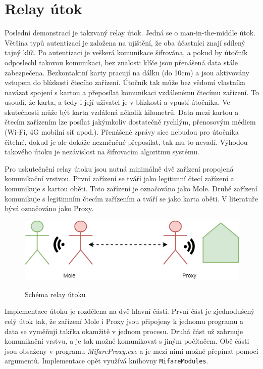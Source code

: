 \section{Relay útok}
\label{relayImplementace}
Poslední demonstrací je takzvaný relay útok. Jedná se o {man-in-the-middle} útok. Většina typů autentizací je založena na ujištění, že oba účastníci znají sdílený tajný klíč. Po autentizaci je veškerá komunikace šifrována, a pokud by útočník odposlechl takovou komunikaci, bez znalosti klíče jsou přenášená data stále zabezpečena. Bezkontaktní karty pracují na dálku (do 10cm) a jsou aktivovány vstupem do blízkosti čtecího zařízení. Útočník tak může bez vědomí vlastníka navázat spojení s kartou a přeposílat komunikaci vzdálenému čtecímu zařízení. To usoudí, že karta, a tedy i její uživatel je v blízkosti a vpustí útočníka. Ve skutečnosti může být karta vzdálená několik kilometrů. Data mezi kartou a čtecím zařízením lze posílat jakýmkoliv dostatečně rychlým, přenosovým médiem ({Wi-Fi}, 4G mobilní síť apod.). Přenášené zprávy sice nebudou pro útočníka čitelné, dokud je ale dokáže nezměněné přeposílat, tak mu to nevadí. Výhodou takového útoku je nezávislost na šifrovacím algoritmu systému.\par

Pro uskutečnění relay útoku jsou nutná minimálně dvě zařízení propojená komunikační vrstvou. První zařízení se tváří jako legitimní čtecí zařízení a komunikuje s kartou oběti. Toto zařízení je označováno jako Mole. Druhé zařízení komunikuje s legitimním čtecím zařízením a tváří se jako karta oběti. V literatuře bývá označováno jako Proxy.\cite{PracticalRelayAttack} 

\begin{figure}[ht]\centering
  \centering
  \includegraphics[width=\linewidth]{obrazky-figures/relayAttack.png}\\[1pt]  
  \caption{Schéma relay útoku}    
  \label{obrazekRelayAttack}
\end{figure}

Implementace útoku je rozdělena na dvě hlavní části. První část je zjednodušený celý útok tak, že zařízení Mole i Proxy jsou připojeny k jednomu programu a data se vyměňují takřka okamžitě v jednom procesu. Druhá část už zahrnuje komunikační vrstvu, a je tak možné komunikovat s jiným počítačem. Obě části jsou obsaženy v programu \emph{MifareProxy.exe} a je mezi nimi možné přepínat pomocí argumentů. Implementace opět využívá knihovny \verb|MifareModules|.
\par
